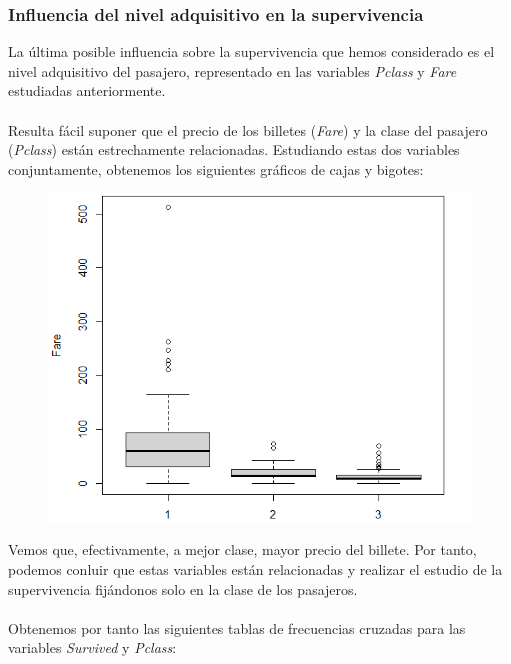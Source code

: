\documentclass{article}
\begin{document}
\subsubsection{Influencia del nivel adquisitivo en la supervivencia}
La última posible influencia sobre la supervivencia que hemos considerado es el nivel adquisitivo del pasajero, representado en las variables \textit{Pclass} y \textit{Fare} estudiadas anteriormente.\\\\
Resulta fácil suponer que el precio de los billetes (\textit{Fare}) y la clase del pasajero (\textit{Pclass}) están estrechamente relacionadas. Estudiando estas dos variables conjuntamente, obtenemos los siguientes gráficos de cajas y bigotes:

\begin{figure}[!h]
    \centering
    \includegraphics[width=0.7\linewidth]{content/fare_class.png}
\end{figure}
\noindent Vemos que, efectivamente, a mejor clase, mayor precio del billete. Por tanto, podemos conluir que estas variables están relacionadas y realizar el estudio de la supervivencia fijándonos solo en la clase de los pasajeros.\\\\
Obtenemos por tanto las siguientes tablas de frecuencias cruzadas para las variables \textit{Survived} y \textit{Pclass}:
\end{document}
